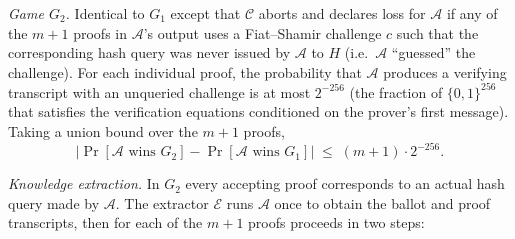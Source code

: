 \emph{Game $G_2$.} Identical to $G_1$ except that $\mathcal{C}$ aborts and declares loss for $\mathcal{A}$ if any of the $m+1$ proofs in $\mathcal{A}$'s output uses a Fiat--Shamir challenge $c$ such that the corresponding hash query was never issued by $\mathcal{A}$ to $H$ (i.e.\ $\mathcal{A}$ ``guessed'' the challenge). For each individual proof, the probability that $\mathcal{A}$ produces a verifying transcript with an unqueried challenge is at most $2^{-256}$ (the fraction of $\{0,1\}^{256}$ that satisfies the verification equations conditioned on the prover's first message). Taking a union bound over the $m+1$ proofs,
\begin{equation*}
    |\Pr[\mathcal{A} \text{ wins } G_2] - \Pr[\mathcal{A} \text{ wins } G_1]| \;\leq\; (m+1) \cdot 2^{-256}.
\end{equation*}

\emph{Knowledge extraction.} In $G_2$ every accepting proof corresponds to an actual hash query made by $\mathcal{A}$. The extractor $\mathcal{E}$ runs $\mathcal{A}$ once to obtain the ballot and proof transcripts, then for each of the $m+1$ proofs proceeds in two steps:

